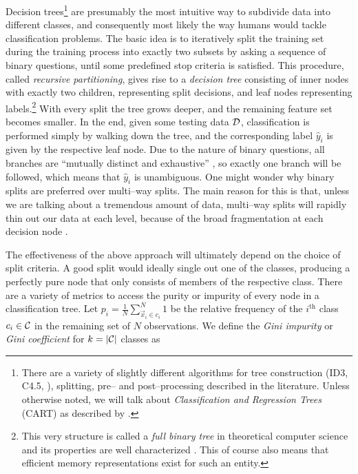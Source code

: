 Decision trees\footnote{There are a variety of slightly different algorithms for tree construction (ID3, C4.5, \etc), splitting, pre-- and post--processing described in the literature. Unless otherwise noted, we will talk about \emph{Classification and Regression Trees} (CART) as described by \citet{breiman1984}.} \citep{breiman1984} are presumably the most intuitive way to subdivide data into different classes, and consequently most likely the way humans would tackle classification problems. The basic idea is to iteratively split the training set during the training process into exactly two subsets by asking a sequence of binary questions, until some predefined stop criteria is satisfied. This procedure, called \emph{recursive partitioning}, gives rise to a \emph{decision tree} consisting of inner nodes with exactly two children, representing split decisions, and leaf nodes representing labels.\footnote{This very structure is called a \emph{full binary tree} in  theoretical computer science and its properties are well characterized \citep{knuth1981}. This of course also means that efficient memory representations exist for such an entity.} With every split the tree grows deeper, and the remaining feature set becomes smaller. In the end, given some testing data $\mathcal{D}$, classification is performed simply by walking down the tree, and the corresponding label $\hat y_i$ is given by the respective leaf node. Due to the nature of binary questions, all branches are ``mutually distinct and exhaustive'' \citep{duda2001}, so exactly one branch will be followed, which means that $\hat y_i$ is unambiguous. One might wonder why binary splits are preferred over multi--way splits. The main reason for this is that, unless we are talking about a tremendous amount of data, multi--way splits will rapidly thin out our data at each level, because of the broad fragmentation at each decision node \citep{hastie2001}. %
\\



The effectiveness of the above approach will ultimately depend on the choice of split criteria. A good split would ideally single out one of the classes, producing a perfectly pure node that only consists of members of the respective class. There are a variety of metrics to access the purity or impurity of every node in a classification tree. Let $p_i = \frac{1}{N} \sum\limits_{\vec x_i \in c_i}^N 1$ be the relative frequency of the $i^{\text{th}}$ class $c_i \in \mathcal{C}$ in the remaining set of $N$ observations. We define the \emph{Gini impurity} or \emph{Gini coefficient} for $k = |\mathcal{C}|$ classes as

